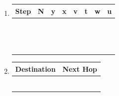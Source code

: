 \documentclass{report}
\begin{document}
\begin{problem}
\begin{answer}{30em}
    \begin{enumerate}
    \item   \begin{tabular}[h]{|c|c|c|c|c|c|c|c|}
            \hline
            Step &
            N &
            y &
            x &
            v &
            t &
            w &
            u \\
            \hline
             & & & & & & & \\
             & & & & & & & \\
             & & & & & & & \\
             & & & & & & & \\
             & & & & & & & \\
             & & & & & & & \\
             & & & & & & & \\
             & & & & & & & \\
             & & & & & & & \\
             & & & & & & & \\
             & & & & & & & \\
             & & & & & & & \\
             & & & & & & & \\
             & & & & & & & \\
            \hline
            \end{tabular}
    \item \begin{tabular}{|c|c|}
    \hline
    Destination &   Next Hop \\ \hline
      &  \\
      &  \\
      &  \\
      &  \\
      &  \\
      &  \\\hline
    \end{tabular}
    \end{enumerate}
\end{answer}

\end{problem}



\newpage
\end{document}
